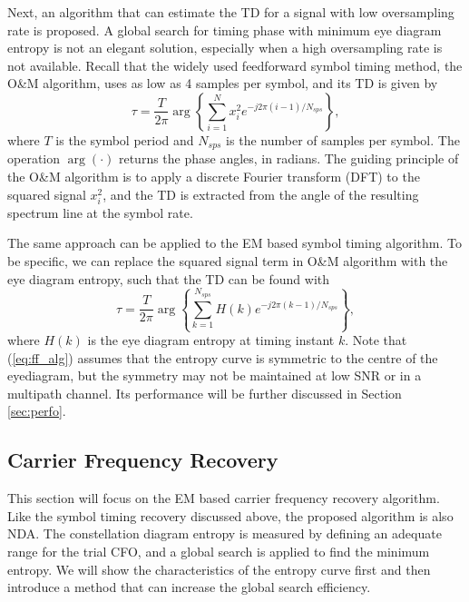 \documentclass[journal,comsoc,onecolumn, 12pt,draftclsnofoot]{IEEEtran}
\begin{document}
Next, an algorithm that can estimate the TD for a signal with low oversampling rate is proposed.
A global search for timing phase with minimum eye diagram entropy is not an elegant solution, especially when a high oversampling rate is not available.
Recall that the widely used feedforward symbol timing method, the O\&M algorithm, uses as low as 4 samples per symbol, and its TD is given by
\begin{equation}
\tau=\frac{T}{2\pi}\arg \left\{ {\sum\limits_{i = 1}^{N} {x_i^2{e^{ - j2\pi (i-1)/N_{sps}}}} } \right\},
\label{eq:om}
\end{equation}
where \(T\) is the symbol period and \(N_{sps}\) is the number of samples per symbol.
The operation \(\arg( \cdot )\) returns the phase angles, in radians.
The guiding principle of the O\&M algorithm is to apply a discrete Fourier transform (DFT) to the squared signal \(x_i^2\),
and the TD is extracted from the angle of the resulting spectrum line at the symbol rate.

The same approach can be applied to the EM based symbol timing algorithm.
To be specific, we can replace the squared signal term in O\&M algorithm with the eye diagram entropy,
such that the TD can be found with
\begin{equation}
\tau  = \frac{T}{{2\pi }}\arg \left\{ {\sum\limits_{k = 1}^{N_{sps}} {H(k){e^{ - j2\pi (k-1)/N_{sps}}}} } \right\},
\label{eq:ff_alg}
\end{equation}
where \(H(k)\) is the eye diagram entropy at timing instant \(k\).
Note that (\ref{eq:ff_alg}) assumes that the entropy curve is symmetric to the centre of the eyediagram,
but the symmetry may not be maintained at low SNR or in a multipath channel.
Its performance will be further discussed in Section \ref{sec:perfo}.

\subsection{Carrier Frequency Recovery}
This section will focus on the EM based carrier frequency recovery algorithm.
Like the symbol timing recovery discussed above, the proposed algorithm is also NDA.
The constellation diagram entropy is measured by defining an adequate range for the trial CFO, and a global search is applied to find the minimum entropy. 
We will show the characteristics of the entropy curve first and then introduce a method that can increase the global search efficiency. 
\end{document}
